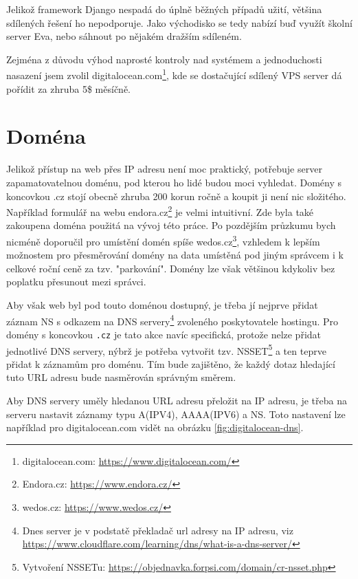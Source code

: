 Jelikož framework Django nespadá do úplně běžných případů užití, většina sdílených řešení ho nepodporuje. Jako východisko se tedy nabízí buď využít školní server Eva, nebo sáhnout po nějakém dražším sdíleném.
\par Zejména z důvodu výhod naprosté kontroly nad systémem a jednoduchosti nasazení jsem zvolil digitalocean.com\footnote{digitalocean.com: \url{https://www.digitalocean.com/}}, kde se dostačující sdílený VPS server dá pořídit za zhruba 5\$ měsíčně.

\section{Doména}
Jelikož přístup na web přes IP adresu není moc praktický, potřebuje server zapamatovatelnou doménu, pod kterou ho lidé budou moci vyhledat. Domény s koncovkou .cz stojí obecně zhruba 200 korun ročně a koupit ji není nic složitého. Například formulář na webu endora.cz\footnote{Endora.cz: \url{https://www.endora.cz/}} je velmi intuitivní. Zde byla také zakoupena doména použitá na vývoj této práce. Po pozdějším průzkumu bych nicméně doporučil pro umístění domén spíše wedos.cz\footnote{wedos.cz: \url{https://www.wedos.cz/}}, vzhledem k lepším možnostem pro přesměrování domény na data umístěná pod jiným správcem i k celkové roční ceně za tzv. "parkování". Domény lze však většinou kdykoliv bez poplatku přesunout mezi správci.  
\par Aby však web byl pod touto doménou dostupný, je třeba jí nejprve přidat záznam NS s odkazem na DNS servery\footnote{Dnes server je v podstatě překladač url adresy na IP adresu, viz \url{https://www.cloudflare.com/learning/dns/what-is-a-dns-server/}} zvoleného poskytovatele hostingu. Pro domény s koncovkou \texttt{.cz} je tato akce navíc specifická, protože nelze přidat jednotlivé DNS servery, nýbrž je potřeba vytvořit tzv. NSSET\footnote{Vytvoření NSSETu: \url{https://objednavka.forpsi.com/domain/cr-nsset.php}} a ten teprve přidat k záznamům pro doménu. Tím bude zajištěno, že každý dotaz hledající tuto URL adresu bude nasměrován správným směrem.

\par Aby DNS servery uměly hledanou URL adresu přeložit na IP adresu, je třeba na serveru nastavit záznamy typu A(IPV4), AAAA(IPV6) a NS. Toto nastavení lze například pro digitalocean.com vidět na obrázku \ref{fig:digitalocean-dns}.


